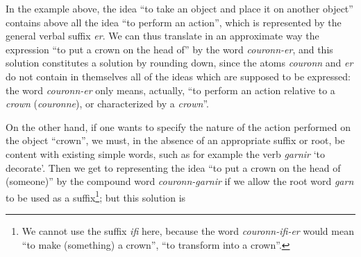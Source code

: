 \begin{sloppypar}
{  In the example above, the idea ``to take an object and place it on
  another object'' contains above all the idea ``to perform an
  action'', which is represented by the general verbal suffix
  \emph{er}.  We can thus translate in an approximate way the
  expression ``to put a crown on the head of'' by the word
  \emph{couronn-er}, and this solution constitutes a solution by
  rounding down, since the atoms \emph{couronn} and \emph{er} do not
  contain in themselves all of the ideas which are supposed to be
  expressed: the word \emph{couronn-er} only means, actually, ``to
  perform an action relative to a \emph{crown} (\emph{couronne}), or
  characterized by a \emph{crown}''.

  On the other hand, if one wants to specify the nature of the action
  performed on the object ``crown'', we must, in the absence of an
  appropriate suffix or root, be content with existing simple words,
  such as for example the verb \emph{garnir} `to decorate'. Then we
  get to representing the idea ``to put a crown on the head of
  (someone)'' by the compound word \emph{couronn-garnir} if we allow
  the root word \emph{garn} to be used as a suffix\footnote{We cannot
    use the suffix \emph{ifi} here, because the word
    \emph{couronn-ifi-er} would mean ``to make (something) a crown'',
    ``to transform into a crown''.}; but this solution is

}

\end{sloppypar}
